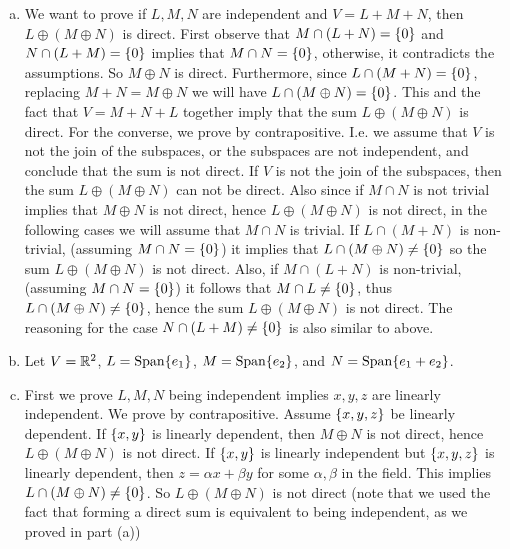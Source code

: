 \begin{problem}
	\begin{solution}
		\begin{enumerate}[(a)]
			\item We want to prove if $ L,M,N $ are independent and $ V = L+M+N $, then $ L \oplus (M\oplus N) $ is direct. First observe that $ M\cap (L+N) = \{0\} $ and $ N\cap(L+M) = \{0\} $ implies that $ M\cap N = \{0\} $, otherwise, it contradicts the assumptions. So $ M\oplus N $ is direct. Furthermore, since $ L\cap (M+N) = \{0\} $, replacing $ M+N = M\oplus N $ we will have $ L\cap (M\oplus N) = \{0\} $. This and the fact that $ V = M+N+L $ together imply that the sum $ L\oplus (M\oplus N) $ is direct. For the converse, we prove by contrapositive. I.e. we assume that $ V $ is not the join of the subspaces, or the subspaces are not independent, and conclude that the sum is not direct. If $ V $ is not the join of the subspaces, then the sum $ L\oplus(M\oplus N) $ can not be direct. Also since if $ M\cap N $ is not trivial implies that $ M\oplus N $ is not direct, hence $ L\oplus(M\oplus N) $ is not direct, in the following cases we will assume that $ M\cap N $ is trivial. If $ L\cap (M+N) $ is non-trivial, (assuming $ M\cap N = \{0\} $) it implies that $ L\cap (M\oplus N) \neq \{0\} $ so the sum $ L\oplus(M\oplus N) $ is not direct. Also, if $ M\cap (L+N) $ is non-trivial, (assuming $ M\cap N=\{0\} $) it follows that $ M\cap L \neq \{0\} $, thus $ L\cap (M\oplus N) \neq \{0\} $, hence the sum $ L\oplus(M\oplus N) $ is not direct. The reasoning for the case $ N\cap (L+M) \neq \{0\} $ is also similar to above.
			
			\item Let $ V=\mathbb{R}^2 $, $ L = \operatorname{Span} \{e_1\} $, $ M = \operatorname{Span}\{e_2\} $, and $ N = \operatorname{Span}\{e_1+e_2\} $.
			
			\item First we prove $ L,M,N $ being independent implies $ x,y,z $ are linearly independent. We prove by contrapositive. Assume $ \{x,y,z\} $ be linearly dependent. If $ \{x,y\} $ is linearly dependent, then $ M\oplus N $ is not direct, hence $ L\oplus (M\oplus N) $ is not direct. If $ \{x,y\} $ is linearly independent but $ \{x,y,z\} $ is linearly dependent, then $ z = \alpha x + \beta y $ for some $ \alpha,\beta $ in the field. This implies $ L\cap (M\oplus N) \neq\{0\} $. So $ L\oplus(M\oplus N) $ is not direct (note that we used the fact that forming a direct sum is equivalent to being independent, as we proved in part (a))
			

\end{enumerate}
\end{solution}
\end{problem}
